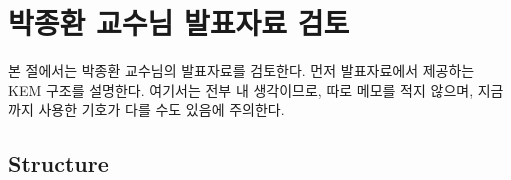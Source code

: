 \section{박종환 교수님 발표자료 검토}

본 절에서는 박종환 교수님의 발표자료를 검토한다. 먼저 발표자료에서 제공하는 KEM
구조를 설명한다. 여기서는 전부 내 생각이므로, 따로 메모를 적지 않으며, 지금까지
사용한 기호가 다를 수도 있음에 주의한다.

\subsection{Structure}

\newcommand{\ENCODE}{\textsf{Encode}}
\newcommand{\DECODE}{\textsf{Decode}}
\newcommand{\IDENT}{\textsf{Ident}}
\newcommand{\ENC}{\textsf{Enc}}
\newcommand{\DEC}{\textsf{Dec}}


